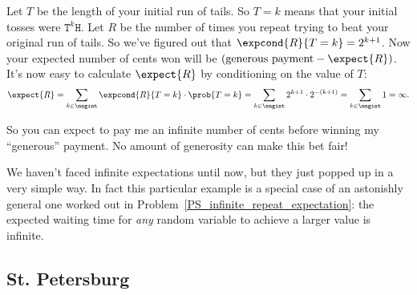 Let $T$ be the length of your initial run of tails.  So $T = k$ means
that your initial tosses were $\texttt{T}^k\texttt{H}$.  Let $R$ be
the number of times you repeat trying to beat your original run of
tails.  So we've figured out that $\expcond{R}{T=k} = 2^{k+1}$.  Now your
expected number of cents won will be $(\text{generous payment} - \expect{R})$.
\]
It's now easy to calculate $\expect{R}$ by conditioning on the value
of $T$:
\[
\expect{R}
     = \sum_{k \in \nngint} \expcond{R}{T=k} \cdot \prob{T=k}
     = \sum_{k \in \nngint}  2^{k+1} \cdot 2^{-(k+1)}
     = \sum_{k \in \nngint} 1 = \infty.
\]

\iffalse
\begin{align*}
\expect{R}
    & = \sum_{k \in \nngint} \expcond{R}{T=k} \cdot \prob{T=k}\\
    & = \sum_{k \in \nngint}  2^{k+1} \cdot 2^{-(k+1)}\\
    & = \sum_{k \in \nngint} 1 = \infty.
\end{align*}
\fi

So you can expect to pay me an infinite number of cents before winning
my ``generous'' payment.  No amount of generosity can make this bet
fair!

We haven't faced infinite expectations until now, but they just popped
up in a very simple way.  In fact this particular example is a special
case of an astonishly general one worked out in
Problem~\ref{PS_infinite_repeat_expectation}: the expected waiting
time for \emph{any} random variable to achieve a larger value is
infinite.

\subsection{St. Petersburg}



\begin{problems}
\classproblems
{}

\end{problems}
